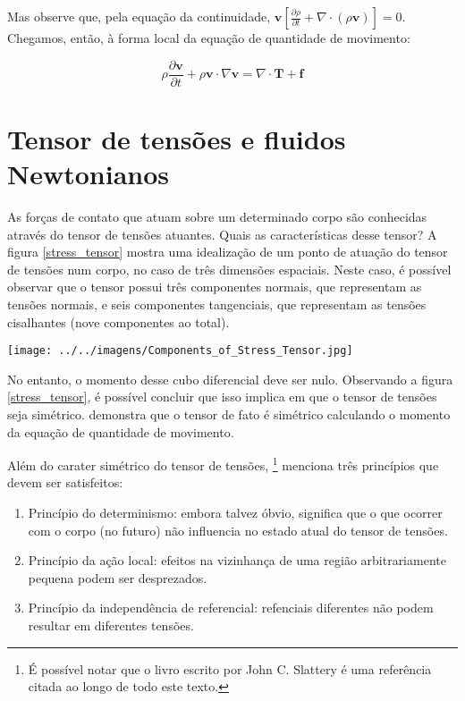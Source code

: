 \documentclass[a4paper,portuguese,10pt]{article}
\renewcommand{\div}{\nabla\cdot}
\newcommand{\grad}{\nabla}
\renewcommand{\D}{\partial}
\renewcommand{\vec}{\mathbf}
\begin{document}
Mas observe que, pela equação da continuidade, $\vec{v}[\frac{\D\rho}{\D t}+\div(\rho\vec{v})] = 0$. Chegamos, então, à forma local da equação de quantidade de movimento:

\begin{equation}
  \rho\frac{\D\vec{v}}{\D t} + \rho\vec{v}\cdot\grad\vec{v} = \div\vec{T} + \vec{f}
  \label{eq_qdm_dif}
\end{equation}

\section{Tensor de tensões e fluidos Newtonianos}

As forças de contato que atuam sobre um determinado corpo são conhecidas através do tensor de tensões atuantes. Quais as características desse tensor? A figura \ref{stress_tensor} mostra uma idealização de um ponto de atuação do tensor de tensões num corpo, no caso de três dimensões espaciais. Neste caso, é possível observar que o tensor possui três componentes normais, que representam as tensões normais, e seis componentes tangenciais, que representam as tensões cisalhantes (nove componentes ao total).

\begin{center}
  \texttt{[image: ../../imagens/Components\_of\_Stress\_Tensor.jpg]}\\
  \label{stress_tensor}
\end{center}

No entanto, o momento desse cubo diferencial deve ser nulo. Observando a figura \ref{stress_tensor}, é possível concluir que isso implica em que o tensor de tensões seja simétrico.  demonstra que o tensor de fato é simétrico calculando o momento da equação de quantidade de movimento.

Além do carater simétrico do tensor de tensões, \footnote{É possível notar que o livro escrito por John C. Slattery é uma referência citada ao longo de todo este texto.} menciona três princípios que devem ser satisfeitos:

\begin{enumerate}
\item Princípio do determinismo: embora talvez óbvio, significa que o que ocorrer com o corpo (no futuro) não influencia no estado atual do tensor de tensões.
\item Princípio da ação local: efeitos na vizinhança de uma região arbitrariamente pequena podem ser desprezados.
\item Princípio da independência de referencial: refenciais diferentes não podem resultar em diferentes tensões.
\end{enumerate}
\end{document}
